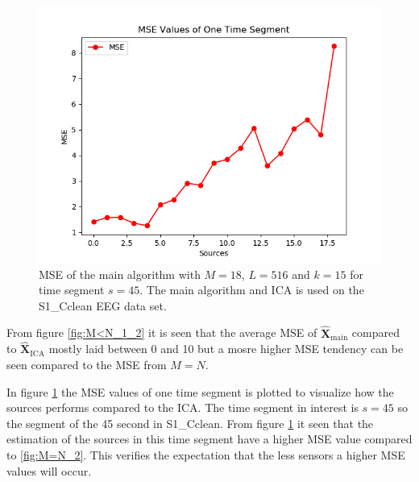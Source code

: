 \begin{figure}[H]
\centering
\includegraphics[scale=0.5]{figures/ch_7/MSE_3M_N.png}
	\caption{MSE of the main algorithm with $M=18$, $L = 516$ and $k=15$ for time segment $s=45$. The main algorithm and ICA is used on the S1\_Cclean EEG data set.}
\label{fig:M<N_2}
\end{figure}
\noindent
From figure \ref{fig:M<N_1_2} it is seen that the average MSE of $\hat{\mathbf{X}}_{\text{main}}$ compared to $\hat{\mathbf{X}}_{\text{ICA}}$ mostly laid between 0 and 10 but a mosre higher MSE tendency can be seen compared to the MSE from $M=N$. 

In figure \ref{fig:M<N_2} the MSE values of one time segment is plotted to visualize how the sources performs compared to the ICA. The time segment in interest is $s = 45$ so the segment of the 45 second in S1\_Cclean. 
From figure \ref{fig:M<N_2} it seen that the estimation of the sources in this time segment have a higher MSE value compared to \ref{fig:M=N_2}. This verifies the expectation that the less sensors a higher MSE values will occur.

